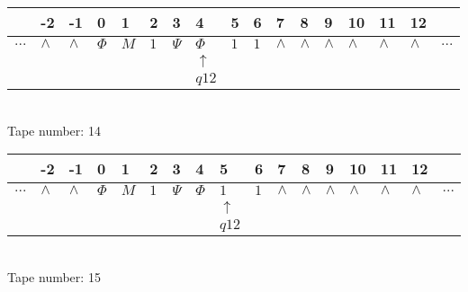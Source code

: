 \documentclass{article}
\begin{document}
\begin{table}[H]
\centering
\begin{tabular}{lllllllllllllllll}
 & -2 & -1 & 0 & 1 & 2 & 3 & 4 & 5 & 6 & 7 & 8 & 9 & 10 & 11 & 12 & \\
\hline
$...$ & \multicolumn{1}{|l|}{$\wedge$} & \multicolumn{1}{|l|}{$\wedge$} & \multicolumn{1}{|l|}{$\Phi$} & \multicolumn{1}{|l|}{$M$} & \multicolumn{1}{|l|}{$1$} & \multicolumn{1}{|l|}{$\Psi$} & \multicolumn{1}{|l|}{$\Phi$} & \multicolumn{1}{|l|}{$1$} & \multicolumn{1}{|l|}{$1$} & \multicolumn{1}{|l|}{$\wedge$} & \multicolumn{1}{|l|}{$\wedge$} & \multicolumn{1}{|l|}{$\wedge$} & \multicolumn{1}{|l|}{$\wedge$} & \multicolumn{1}{|l|}{$\wedge$} & \multicolumn{1}{|l|}{$\wedge$} & $...$\\
\hline
&  &  &  &  &  &  & $\uparrow$ &  &  &  &  &  &  &  &  &  \\
&  &  &  &  &  &  & $ q12 $ &  &  &  &  &  &  &  &  &  \\
\end{tabular}
\\
Tape number: 14
\noindent\makebox[\linewidth]{\hdashrule{\textwidth}{1pt}{1pt}}\end{table}

\begin{table}[H]
\centering
\begin{tabular}{lllllllllllllllll}
 & -2 & -1 & 0 & 1 & 2 & 3 & 4 & 5 & 6 & 7 & 8 & 9 & 10 & 11 & 12 & \\
\hline
$...$ & \multicolumn{1}{|l|}{$\wedge$} & \multicolumn{1}{|l|}{$\wedge$} & \multicolumn{1}{|l|}{$\Phi$} & \multicolumn{1}{|l|}{$M$} & \multicolumn{1}{|l|}{$1$} & \multicolumn{1}{|l|}{$\Psi$} & \multicolumn{1}{|l|}{$\Phi$} & \multicolumn{1}{|l|}{$1$} & \multicolumn{1}{|l|}{$1$} & \multicolumn{1}{|l|}{$\wedge$} & \multicolumn{1}{|l|}{$\wedge$} & \multicolumn{1}{|l|}{$\wedge$} & \multicolumn{1}{|l|}{$\wedge$} & \multicolumn{1}{|l|}{$\wedge$} & \multicolumn{1}{|l|}{$\wedge$} & $...$\\
\hline
&  &  &  &  &  &  &  & $\uparrow$ &  &  &  &  &  &  &  &  \\
&  &  &  &  &  &  &  & $ q12 $ &  &  &  &  &  &  &  &  \\
\end{tabular}
\\
Tape number: 15
\noindent\makebox[\linewidth]{\hdashrule{\textwidth}{1pt}{1pt}}\end{table}
\end{document}
